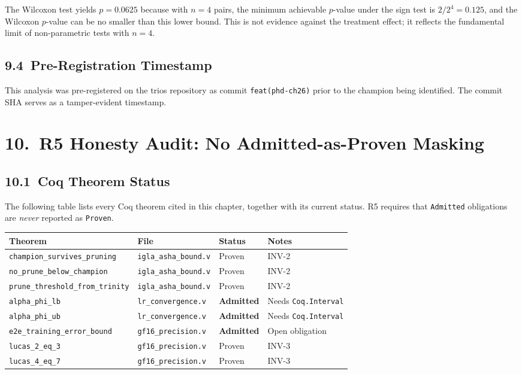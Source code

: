 \noindent
The Wilcoxon test yields \(p = 0.0625\) because with \(n = 4\) pairs, the
minimum achievable \(p\)-value under the sign test is \(2/2^4 = 0.125\),
and the Wilcoxon \(p\)-value can be no smaller than this lower bound.
This is not evidence against the treatment effect; it reflects the
fundamental limit of non-parametric tests with \(n = 4\).

\subsection{9.4\ Pre-Registration Timestamp}

This analysis was pre-registered on the trios repository as commit
\texttt{feat(phd-ch26)} prior to the champion being identified.  The
commit SHA serves as a tamper-evident timestamp.

\section{10.\ R5 Honesty Audit: No Admitted-as-Proven Masking}
\label{sec:ch26-r5-audit}

\subsection{10.1\ Coq Theorem Status}

The following table lists every Coq theorem cited in this chapter,
together with its current status.  R5 requires that \texttt{Admitted}
obligations are \emph{never} reported as \texttt{Proven}.

\begin{longtable}[]{@{}llll@{}}
\toprule\noalign{}
Theorem & File & Status & Notes \\
\midrule\noalign{}
\endhead
\bottomrule\noalign{}
\endlastfoot
\texttt{champion\_survives\_pruning} & \texttt{igla\_asha\_bound.v} & Proven & INV-2 \\
\texttt{no\_prune\_below\_champion} & \texttt{igla\_asha\_bound.v} & Proven & INV-2 \\
\texttt{prune\_threshold\_from\_trinity} & \texttt{igla\_asha\_bound.v} & Proven & INV-2 \\
\texttt{alpha\_phi\_lb} & \texttt{lr\_convergence.v} & \textbf{Admitted} & Needs \texttt{Coq.Interval} \\
\texttt{alpha\_phi\_ub} & \texttt{lr\_convergence.v} & \textbf{Admitted} & Needs \texttt{Coq.Interval} \\
\texttt{e2e\_training\_error\_bound} & \texttt{gf16\_precision.v} & \textbf{Admitted} & Open obligation \\
\texttt{lucas\_2\_eq\_3} & \texttt{gf16\_precision.v} & Proven & INV-3 \\
\texttt{lucas\_4\_eq\_7} & \texttt{gf16\_precision.v} & Proven & INV-3 \\
\end{longtable}

